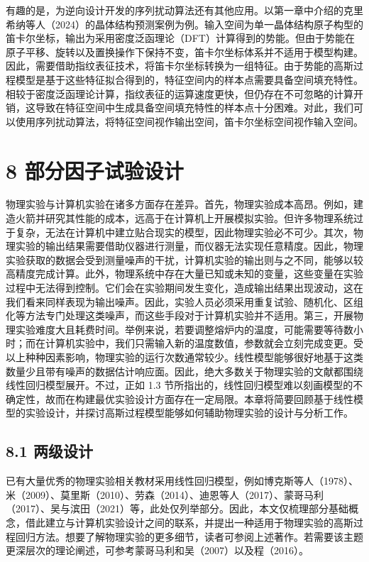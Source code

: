 \documentclass{ctexart}
\begin{document}
有趣的是，为逆向设计开发的序列扰动算法还有其他应用。以第一章中介绍的克里希纳等人（2024）的晶体结构预测案例为例。输入空间为单一晶体结构原子构型的笛卡尔坐标，输出为采用密度泛函理论（DFT）计算得到的势能。但由于势能在原子平移、旋转以及置换操作下保持不变，笛卡尔坐标体系并不适用于模型构建。因此，需要借助指纹表征技术，将笛卡尔坐标转换为一组特征。由于势能的高斯过程模型是基于这些特征拟合得到的，特征空间内的样本点需要具备空间填充特性。相较于密度泛函理论计算，指纹表征的运算速度更快，但仍存在不可忽略的计算开销，这导致在特征空间中生成具备空间填充特性的样本点十分困难。对此，我们可以使用序列扰动算法，将特征空间视作输出空间，笛卡尔坐标空间视作输入空间。

\section*{8 部分因子试验设计}

物理实验与计算机实验在诸多方面存在差异。首先，物理实验成本高昂。例如，建造火箭并研究其性能的成本，远高于在计算机上开展模拟实验。但许多物理系统过于复杂，无法在计算机中建立贴合现实的模型，因此物理实验必不可少。其次，物理实验的输出结果需要借助仪器进行测量，而仪器无法实现任意精度。因此，物理实验获取的数据会受到测量噪声的干扰，计算机实验的输出则与之不同，能够以较高精度完成计算。此外，物理系统中存在大量已知或未知的变量，这些变量在实验过程中无法得到控制。它们会在实验期间发生变化，造成输出结果出现波动，这在我们看来同样表现为输出噪声。因此，实验人员必须采用重复试验、随机化、区组化等方法专门处理这类噪声，而这些手段对于计算机实验并不适用。第三，开展物理实验难度大且耗费时间。举例来说，若要调整熔炉内的温度，可能需要等待数小时；而在计算机实验中，我们只需输入新的温度数值，参数就会立刻完成变更。受以上种种因素影响，物理实验的运行次数通常较少。线性模型能够很好地基于这类数量少且带有噪声的数据估计响应面。因此，绝大多数关于物理实验的文献都围绕线性回归模型展开。不过，正如 1.3 节所指出的，线性回归模型难以刻画模型的不确定性，故而在构建最优实验设计方面存在一定局限。本章将简要回顾基于线性模型的实验设计，并探讨高斯过程模型能够如何辅助物理实验的设计与分析工作。

\subsection*{8.1 两级设计}

已有大量优秀的物理实验相关教材采用线性回归模型，例如博克斯等人（1978）、米（2009）、莫里斯（2010）、劳森（2014）、迪恩等人（2017）、蒙哥马利（2017）、吴与滨田（2021）等，此处仅列举部分。因此，本文仅梳理部分基础概念，借此建立与计算机实验设计之间的联系，并提出一种适用于物理实验的高斯过程回归方法。想要了解物理实验的更多细节，读者可参阅上述著作。若需要该主题更深层次的理论阐述，可参考蒙哥马利和吴（2007）以及程（2016）。
\end{document}
